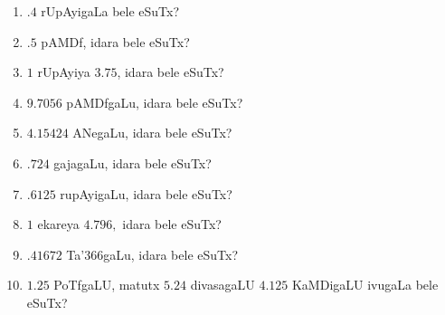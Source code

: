 \begin{enumerate}[\rm (1)]
\item $.4$ rUpAyigaLa bele eSuTx?

\item $.5$ pAMDf, idara bele eSuTx?

\item $1$ rUpAyiya $3.75$, idara bele eSuTx?

\item $9.7056$ pAMDfgaLu, idara bele eSuTx?

\item $4.15424$ ANegaLu, idara bele eSuTx?

\item $.724$ gajagaLu, idara bele eSuTx?

\item $.6125$ rupAyigaLu, idara bele eSuTx?

\item $1$ ekareya $4.796,$ idara bele eSuTx?

\item $.41672$ Ta\char'366gaLu, idara bele eSuTx?

\item $1.25$ PoTfgaLU, matutx $5.24$ divasagaLU $4.125$ KaMDigaLU ivugaLa bele eSuTx?
\end{enumerate}
